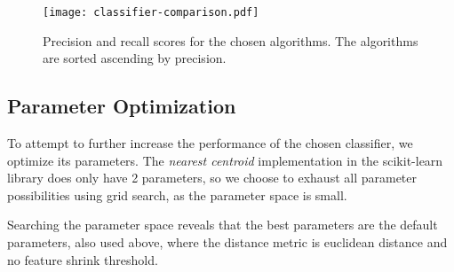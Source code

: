 
\begin{figure}[tbp]
\centering
\texttt{[image: classifier-comparison.pdf]}
\caption[Precision and recall scores for the chosen algorithms]{Precision and recall scores for the chosen algorithms. The algorithms are sorted ascending by precision.}\label{fig:classifier_comparison}
\end{figure}


\subsection{Parameter Optimization}
To attempt to further increase the performance of the chosen classifier, we optimize its parameters. The \emph{nearest centroid} implementation in the scikit-learn library does only have 2 parameters, so we choose to exhaust all parameter possibilities using grid search, as the parameter space is small.

Searching the parameter space reveals that the best parameters are the default parameters, also used above, where the distance metric is euclidean distance and no feature shrink threshold.

